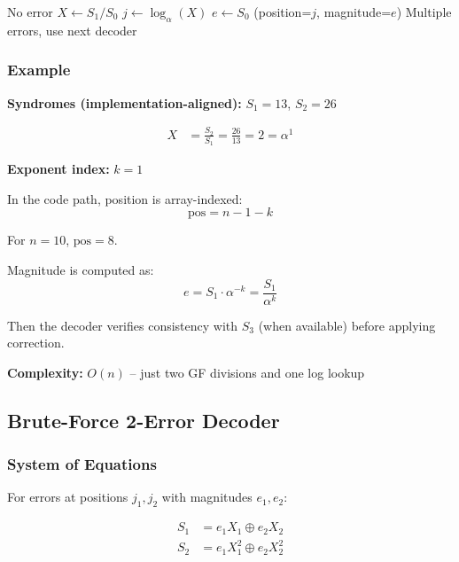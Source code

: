 \documentclass[11pt,a4paper]{article}
\begin{document}
\begin{algorithm}[H]
\caption{Peterson Single Error Decoder}
\begin{algorithmic}[1]
    \State \Return No error
\EndIf
{}
    \State $X \gets S_1 / S_0$
    \State $j \gets \log_\alpha(X)$
    \State $e \gets S_0$
    \State \Return (position=$j$, magnitude=$e$)
\Else
    \State \Return Multiple errors, use next decoder
\EndIf
\end{algorithmic}
\end{algorithm}

\subsubsection{Example}

\textbf{Syndromes (implementation-aligned):} $S_1 = 13$, $S_2 = 26$

\begin{align}
X &= \frac{S_2}{S_1} = \frac{26}{13} = 2 = \alpha^1
\end{align}

\textbf{Exponent index:} $k = 1$

In the code path, position is array-indexed:
\begin{equation}
\text{pos} = n - 1 - k
\end{equation}

For $n=10$, $\text{pos}=8$.

Magnitude is computed as:
\begin{equation}
e = S_1 \cdot \alpha^{-k} = \frac{S_1}{\alpha^k}
\end{equation}

Then the decoder verifies consistency with $S_3$ (when available) before applying correction.

\textbf{Complexity:} $O(n)$ -- just two GF divisions and one log lookup

\subsection{Brute-Force 2-Error Decoder}

\subsubsection{System of Equations}

For errors at positions $j_1, j_2$ with magnitudes $e_1, e_2$:

\begin{align}
S_1 &= e_1 X_1 \oplus e_2 X_2 \\
S_2 &= e_1 X_1^2 \oplus e_2 X_2^2
\end{align}
\end{document}
